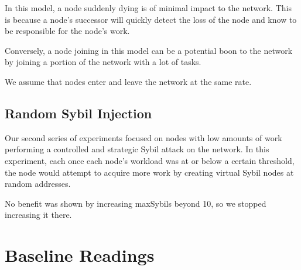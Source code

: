 In this model, a node suddenly dying is of minimal impact to the network.
This is because a node's successor will quickly detect the loss of the node and know to be responsible for the node's work.

Conversely, a node joining in this model can be a potential boon to the network by joining a portion of the network with a lot of tasks.



We assume that nodes enter and leave the network at the same rate.


\subsection{Random Sybil Injection}
Our second series of experiments focused on nodes with low amounts of work performing a controlled and strategic Sybil attack \cite{sybil} on the network.
In this experiment, each once each node's workload was at or below a certain threshold, the node would attempt to acquire more work by creating virtual Sybil nodes at random addresses.




No benefit was shown by increasing maxSybils beyond 10, so we stopped increasing it there.





\section{Baseline Readings}